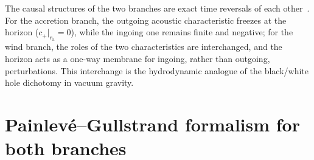 \documentclass[12pt,a4paper,preprint]{elsarticle}
\begin{document}
            The causal structures of the two branches are exact time reversals of each other~\cite{SemyannikovAV_GlobalAcousticGeometryOfMichelFlowInPainleveGullstrandCoordinates_2026}. For the accretion branch, the outgoing acoustic characteristic freezes at the horizon ($c_{+}|_{r_{\mathrm{a}}} = 0$), while the ingoing one remains finite and negative; for the wind branch, the roles of the two characteristics are interchanged, and the horizon acts as a one-way membrane for ingoing, rather than outgoing, perturbations. This interchange is the hydrodynamic analogue of the black/white hole dichotomy in vacuum gravity.

    \section{Painlev\'{e}--Gullstrand formalism for both branches}\label{sec:pg-framework}
\end{document}
